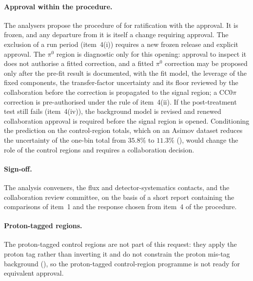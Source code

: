 \paragraph{Approval within the procedure.} The analysers propose the procedure of
 for ratification with the approval. It is frozen, and any departure from
it is itself a change requiring approval. The exclusion of a run period (item~4(i)) requires a new frozen
release and explicit approval. The $\pi^0$ region is diagnostic only for this opening: approval to
inspect it does not authorise a fitted correction, and a fitted $\pi^0$ correction may be proposed only
after the pre-fit result is documented, with the fit model, the leverage of the fixed components, the
transfer-factor uncertainty and its floor reviewed by the collaboration before the correction is
propagated to the signal region; a CC$0\pi$ correction is pre-authorised under the rule of item~4(ii).
If the post-treatment test still fails (item~4(iv)), the background model is revised and renewed
collaboration approval is required before the signal region is opened. Conditioning the prediction on
the control-region totals, which on an Asimov dataset reduces the uncertainty of the one-bin total from
$35.8\%$ to $11.3\%$ (), would change the role of the control regions and
requires a collaboration decision.

\paragraph{Sign-off.} The analysis conveners, the flux and detector-systematics contacts, and the
collaboration review committee, on the basis of a short report containing the comparisons of item~1 and
the response chosen from item~4 of the procedure.

\paragraph{Proton-tagged regions.} The proton-tagged control regions are not part of this request: they
apply the proton tag rather than inverting it and do not constrain the proton mis-tag background
(), so the proton-tagged control-region programme is not ready for
equivalent approval.

